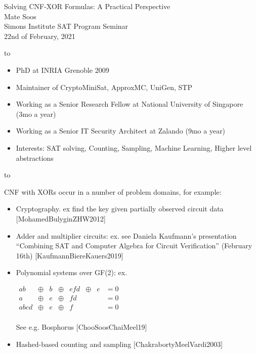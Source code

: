 \documentclass[aspectratio=196]{slides}
\def\TITLE#1{\hbox to \linewidth{\large #1\hfill}}
\def\BOTTOM{\vfill\newpage}
\def\SLIDE#1{\BOTTOM\TITLE{#1}}
\begin{document}
\begin{center}
{\huge Solving CNF-XOR Formulas: A Practical Perspective} \\[1cm]
{\Large Mate Soos}\\[1cm]

{\large Simons Institute SAT Program Seminar}
\\[2ex]
22nd of February, 2021 \\[16ex]

\end{center}
\newpage
\SLIDE{About Me}
\begin{itemize}
\item PhD at INRIA Grenoble 2009
\item Maintainer of CryptoMiniSat, ApproxMC, UniGen, STP
\item Working as a Senior Research Fellow at National University of Singapore (3mo a year)
\item Working as a Senior IT Security Architect at Zalando (9mo a year)
\item Interests: SAT solving, Counting, Sampling, Machine Learning, Higher level abstractions
\end{itemize}
\vfill
\newpage

\SLIDE{CNF-XOR}

CNF with XORs occur in a number of problem domains, for example:
\begin{itemize}
\item Cryptography. ex find the key given partially observed circuit data [MohamedBulyginZHW2012]
\item Adder and multiplier circuits: ex. see Daniela Kaufmann's presentation ``Combining SAT and Computer Algebra for Circuit Verification'' (February 16th) [KaufmannBiereKauers2019]
\item Polynomial systems over GF(2): ex.

$\begin{array}{llllllll}
ab &\oplus &b &\oplus &efd &\oplus &e &= 0\\
a &\oplus &e &\oplus &fd &&&= 0\\
abcd &\oplus &e &\oplus &f &&&= 0\\
\end{array}$

See e.g. Bosphorus [ChooSoosChaiMeel19]

\item Hashed-based counting and sampling [ChakrabortyMeelVardi2003]
\end{itemize}
\end{document}

